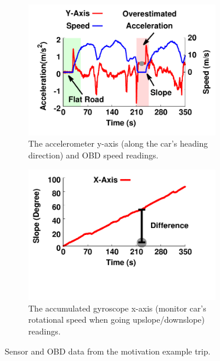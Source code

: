 \begin{figure}[!tbp] \centering
 \begin{center}
  \begin{subfigure}[b]{\linewidth}
    \begin{center}
    \includegraphics[width=3.3in,angle=0]{Figs/SlopeAware/motivation.pdf}
         \vspace{-0.4cm}
         \caption{The accelerometer y-axis (along the car's heading direction) and OBD speed readings.}         
        \label{motivation:a}
	\end{center}
    \end{subfigure} %

    \begin{subfigure}[b]{\linewidth}    
	    \begin{center}
        \includegraphics[width=3.3in,angle=0]{Figs/SlopeAware/gyro_motivation.pdf}
	\vspace{-1.5cm}
        \caption{The accumulated gyroscope x-axis (monitor car's rotational speed when going upslope/downslope) readings.}
        \label{motivation:b}
	 \end{center}
    \end{subfigure} 
\caption{Sensor and OBD data from the motivation example trip.}
\label{motivation}
\vspace{-0.2cm}
\end{center}
\end{figure}


